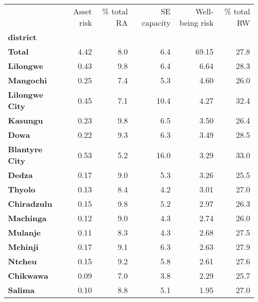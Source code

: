 \begin{tabular}{lrrrrr}
\toprule
{} &  Asset risk &  \% total RA &  SE capacity &  Well-being risk &  \% total RW \\
\textbf{district      } &             &             &              &                  &             \\
\midrule
\textbf{Total         } &        4.42 &         8.0 &          6.4 &            69.15 &        27.8 \\
\textbf{Lilongwe      } &        0.43 &         9.8 &          6.4 &             6.64 &        28.3 \\
\textbf{Mangochi      } &        0.25 &         7.4 &          5.3 &             4.60 &        26.0 \\
\textbf{Lilongwe City } &        0.45 &         7.1 &         10.4 &             4.27 &        32.4 \\
\textbf{Kasungu       } &        0.23 &         9.8 &          6.5 &             3.50 &        26.4 \\
\textbf{Dowa          } &        0.22 &         9.3 &          6.3 &             3.49 &        28.5 \\
\textbf{Blantyre City } &        0.53 &         5.2 &         16.0 &             3.29 &        33.0 \\
\textbf{Dedza         } &        0.17 &         9.0 &          5.3 &             3.26 &        25.5 \\
\textbf{Thyolo        } &        0.13 &         8.4 &          4.2 &             3.01 &        27.0 \\
\textbf{Chiradzulu    } &        0.15 &         9.8 &          5.2 &             2.97 &        26.3 \\
\textbf{Machinga      } &        0.12 &         9.0 &          4.3 &             2.74 &        26.0 \\
\textbf{Mulanje       } &        0.11 &         8.3 &          4.3 &             2.68 &        27.5 \\
\textbf{Mchinji       } &        0.17 &         9.1 &          6.3 &             2.63 &        27.9 \\
\textbf{Ntcheu        } &        0.15 &         9.2 &          5.8 &             2.61 &        27.6 \\
\textbf{Chikwawa      } &        0.09 &         7.0 &          3.8 &             2.29 &        25.7 \\
\textbf{Salima        } &        0.10 &         8.8 &          5.1 &             1.95 &        27.0 \\

\end{tabular}
